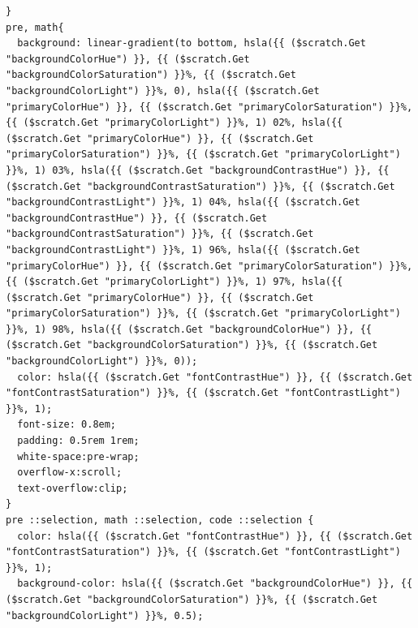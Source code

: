 \documentclass[11pt]{article}
\begin{document}
\begin{enumerate}
\begin{verbatim}
}
pre, math{
  background: linear-gradient(to bottom, hsla({{ ($scratch.Get "backgroundColorHue") }}, {{ ($scratch.Get "backgroundColorSaturation") }}%, {{ ($scratch.Get "backgroundColorLight") }}%, 0), hsla({{ ($scratch.Get "primaryColorHue") }}, {{ ($scratch.Get "primaryColorSaturation") }}%, {{ ($scratch.Get "primaryColorLight") }}%, 1) 02%, hsla({{ ($scratch.Get "primaryColorHue") }}, {{ ($scratch.Get "primaryColorSaturation") }}%, {{ ($scratch.Get "primaryColorLight") }}%, 1) 03%, hsla({{ ($scratch.Get "backgroundContrastHue") }}, {{ ($scratch.Get "backgroundContrastSaturation") }}%, {{ ($scratch.Get "backgroundContrastLight") }}%, 1) 04%, hsla({{ ($scratch.Get "backgroundContrastHue") }}, {{ ($scratch.Get "backgroundContrastSaturation") }}%, {{ ($scratch.Get "backgroundContrastLight") }}%, 1) 96%, hsla({{ ($scratch.Get "primaryColorHue") }}, {{ ($scratch.Get "primaryColorSaturation") }}%, {{ ($scratch.Get "primaryColorLight") }}%, 1) 97%, hsla({{ ($scratch.Get "primaryColorHue") }}, {{ ($scratch.Get "primaryColorSaturation") }}%, {{ ($scratch.Get "primaryColorLight") }}%, 1) 98%, hsla({{ ($scratch.Get "backgroundColorHue") }}, {{ ($scratch.Get "backgroundColorSaturation") }}%, {{ ($scratch.Get "backgroundColorLight") }}%, 0));
  color: hsla({{ ($scratch.Get "fontContrastHue") }}, {{ ($scratch.Get "fontContrastSaturation") }}%, {{ ($scratch.Get "fontContrastLight") }}%, 1);
  font-size: 0.8em;
  padding: 0.5rem 1rem;
  white-space:pre-wrap;
  overflow-x:scroll;
  text-overflow:clip;
}
pre ::selection, math ::selection, code ::selection {
  color: hsla({{ ($scratch.Get "fontContrastHue") }}, {{ ($scratch.Get "fontContrastSaturation") }}%, {{ ($scratch.Get "fontContrastLight") }}%, 1);
  background-color: hsla({{ ($scratch.Get "backgroundColorHue") }}, {{ ($scratch.Get "backgroundColorSaturation") }}%, {{ ($scratch.Get "backgroundColorLight") }}%, 0.5);


\end{verbatim}
\end{enumerate}
\end{document}
